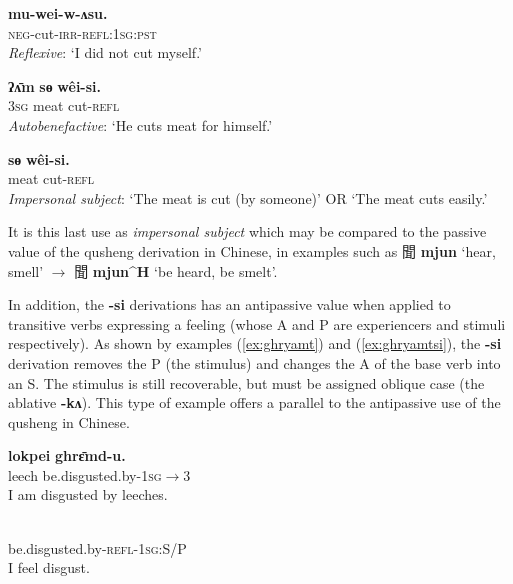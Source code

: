 \documentclass[oneside,a4paper,11pt]{article}
\newcommand{\ipa}[1]{{\phon\textbf{\mbox{#1}}}}
\newcommand{\zh}[1]{{\cn#1}}
\newcommand{\ch}[3]{\zh{#1} \ipa{#2} `#3'}
\begin{document}
\begin{exe}
\ex \label{ex:weiwasu} 
\gll 
	\ipa{mu-wei-w-ʌsu.}  \\
\textsc{neg}-cut-\textsc{irr}-\textsc{refl:1sg:pst} \\
\glt \textit{Reflexive}: `I did not cut myself.'
\end{exe}  

\begin{exe}
\ex \label{ex:weisi2} 
\gll 
 \ipa{ʔʌ̄m} \ipa{sɵ}  	\ipa{wêi-si.}  \\
\textsc{3sg} meat cut-\textsc{refl} \\
\glt \textit{Autobenefactive}: `He cuts meat for himself.'
\end{exe}
 
\begin{exe}
\ex \label{ex:weisi} 
\gll 
 \ipa{sɵ}  	\ipa{wêi-si.}  \\
 meat cut-\textsc{refl} \\
\glt \textit{Impersonal subject}: `The meat is cut (by someone)' OR `The meat cuts easily.'
\end{exe}

It is this last use as \textit{impersonal subject} which may be compared to the passive value of the qusheng derivation in Chinese, in examples such as \ch{聞}{mjun}{hear, smell} $\rightarrow$ \ch{聞}{mjun^H}{be heard, be smelt}.

In addition, the \ipa{-si} derivations has an antipassive value when applied to transitive verbs expressing a feeling (whose A and P are experiencers and stimuli respectively). As shown by examples (\ref{ex:ghryamt})  and (\ref{ex:ghryamtsi}), the \ipa{-si} derivation removes the P (the stimulus) and changes the A of the base verb into an S. The stimulus is still recoverable, but must be assigned oblique case (the ablative \ipa{-kʌ}). This type of example offers a parallel to the antipassive use of the qusheng in Chinese.

\begin{exe}
\ex \label{ex:ghryamt} 
\gll 
  	\ipa{lokpei}  	\ipa{ghrɛ̄md-u.}  \\
leech  be.disgusted.by-\textsc{1sg$\rightarrow$3} \\
 \glt  I am disgusted by leeches.
\end{exe}

\begin{exe}
\ex \label{ex:ghryamtsi} 
\gll \ipa{gʰrɛ̄m-si-ŋʌ}\\
 be.disgusted.by-\textsc{refl-1sg:S/P} \\
\glt  I feel disgust.
\end{exe}
\end{document}
